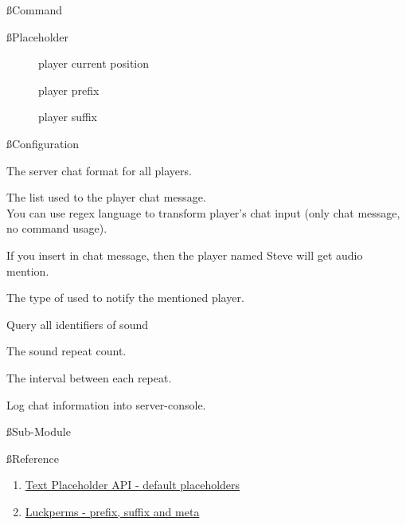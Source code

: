 \ss{Command}

\ss{Placeholder}
\begin{description}
    \item[] player current position
    \item[] player prefix
    \item[] player suffix
\end{description}

\ss{Configuration}

The server chat format for all players.

The  list used to  the player chat message.
\\
You can use regex language to transform player's chat input (only chat message, no command usage).

If you insert  in chat message, then the player named Steve will get audio mention.


The type of  used to notify the mentioned player.
\begin{tips}{Query all identifiers of sound}
\end{tips}




The sound repeat count.


The interval between each repeat.

Log chat information into server-console.

\ss{Sub-Module}



\ss{Reference}
\begin{enumerate}
    \item \href{https://placeholders.pb4.eu/user/default-placeholders/}{Text Placeholder API - default placeholders}
    \item \href{https://luckperms.net/wiki/Prefixes,-Suffixes-&-Meta}{Luckperms - prefix, suffix and meta}
\end{enumerate}